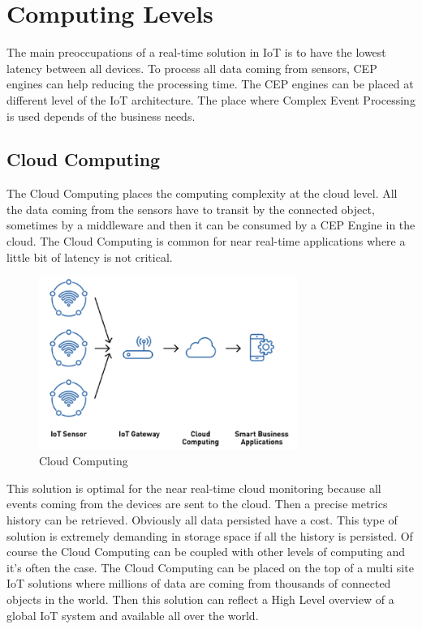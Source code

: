 \documentclass[11pt]{article}
\begin{document}

\section{Computing Levels}

The main preoccupations of a real-time solution in IoT is to have the lowest latency between all devices. To process all data coming from sensors, CEP engines can help reducing the processing time. The CEP engines can be placed at different level of the IoT architecture. The place where Complex Event Processing is used depends of the business needs. 


\subsection{Cloud Computing}

The Cloud Computing places the computing complexity at the cloud level. All the data coming from the sensors have to transit by the connected object, sometimes by a middleware and then it can be consumed by a CEP Engine in the cloud. The Cloud Computing is common for near real-time applications where a little bit of latency is not critical.
\newline
\begin{figure}[h]
	\includegraphics[width=\textwidth,height=160pt]{assets/Cloud_Computing.png}
	\caption{Cloud Computing}
	\label{fig:Cloud-Computing}
\end{figure}

This solution is optimal for the near real-time cloud monitoring because all events coming from the devices are sent to the cloud. Then a precise metrics history can be retrieved. Obviously all data persisted have a cost. This type of solution is extremely demanding in storage space if all the history is persisted.
\newline
\newline
Of course the Cloud Computing can be coupled with other levels of computing and it's often the case. The Cloud Computing can be placed on the top of a multi site IoT solutions where millions of data are coming from thousands of connected objects in the world. Then this solution can reflect a High Level overview of a global IoT system and available all over the world.
\end{document}
